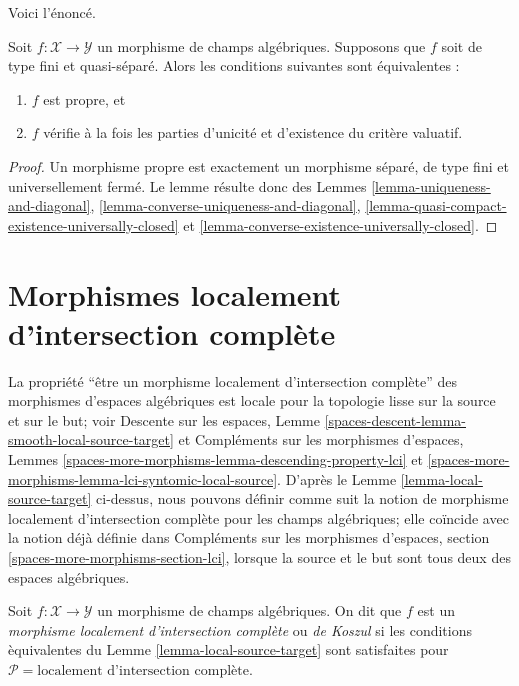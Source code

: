 \noindent
Voici l'énoncé.

\begin{lemma}
\label{lemma-criterion-proper}
Soit $f : \mathcal{X} \to \mathcal{Y}$ un morphisme de champs algébriques.
Supposons que $f$ soit de type fini et quasi-séparé.
Alors les conditions suivantes sont équivalentes :
\begin{enumerate}
\item $f$ est propre, et
\item $f$ vérifie à la fois les parties d'unicité et d'existence
du critère valuatif.
\end{enumerate}
\end{lemma}

\begin{proof}
Un morphisme propre est exactement un morphisme séparé, de type fini et
universellement fermé. Le lemme résulte donc des Lemmes
\ref{lemma-uniqueness-and-diagonal},
\ref{lemma-converse-uniqueness-and-diagonal},
\ref{lemma-quasi-compact-existence-universally-closed} et
\ref{lemma-converse-existence-universally-closed}.
\end{proof}





 
 
\section{Morphismes localement d'intersection compl\`ete}
\label{section-lci}

\noindent
La propri\'et\'e ``\^etre un morphisme localement d'intersection compl\`ete''
des morphismes d'espaces alg\'ebriques est
locale pour la topologie lisse sur la source et sur le but; voir
Descente sur les espaces, Lemme \ref{spaces-descent-lemma-smooth-local-source-target}
et
Compl\'ements sur les morphismes d'espaces, Lemmes
\ref{spaces-more-morphisms-lemma-descending-property-lci} et
\ref{spaces-more-morphisms-lemma-lci-syntomic-local-source}.
D'apr\`es le Lemme \ref{lemma-local-source-target} ci-dessus, nous pouvons d\'efinir
comme suit la notion de morphisme localement d'intersection compl\`ete
pour les champs alg\'ebriques; elle co\"incide avec la
notion d\'ej\`a d\'efinie dans
Compl\'ements sur les morphismes d'espaces,
section \ref{spaces-more-morphisms-section-lci},
lorsque la source et le but sont tous deux des espaces alg\'ebriques.

\begin{definition}
\label{definition-lci}
Soit $f : \mathcal{X} \to \mathcal{Y}$ un morphisme de champs alg\'ebriques.
On dit que $f$ est un {\it morphisme localement d'intersection compl\`ete} ou
{\it de Koszul} si les conditions \`equivalentes du
Lemme \ref{lemma-local-source-target}
sont satisfaites pour $\mathcal{P} = \text{localement d'intersection compl\`ete}$.
\end{definition}

